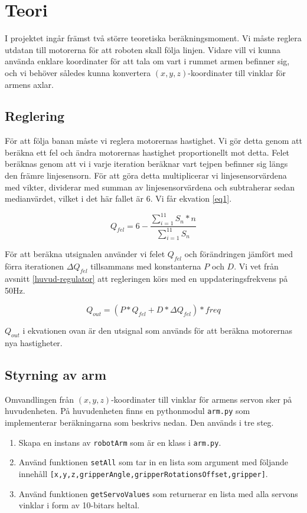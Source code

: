 \section{Teori}
I projektet ingår främst två större teoretiska beräkningsmoment. Vi måste reglera utdatan till motorerna för att roboten skall följa linjen. Vidare vill vi kunna använda enklare koordinater för att tala om vart i rummet armen befinner sig, och vi behöver således kunna konvertera $(x,y,z)$-koordinater till vinklar för armens axlar.

\subsection{Reglering}
För att följa banan måste vi reglera motorernas hastighet. Vi gör detta genom att beräkna ett fel och ändra motorernas hastighet proportionellt mot detta. Felet beräknas genom att vi i varje iteration beräknar vart tejpen befinner sig längs den främre linjesensorn. För att göra detta multiplicerar vi linjesensorvärdena med vikter, dividerar med summan av linjesensorvärdena och subtraherar sedan medianvärdet, vilket i det här fallet är $6$. Vi får ekvation \ref{eq1}.

\begin{equation} \label{eq1}
	Q_{fel}=6-\frac{\sum_{i=1}^{11}S_{n}*n}{\sum_{i=1}^{11}S_n}
\end{equation}

För att beräkna utsignalen använder vi felet $Q_{fel}$ och förändringen jämfört med förra iterationen ${\Delta}Q_{fel}$ tillsammans med konstanterna $P$ och $D$. Vi vet från avsnitt \ref{huvud-regulator} att regleringen körs med en uppdateringsfrekvens på 50Hz.

\begin{equation} \label{eq2}
	Q_{out}=(P*Q_{fel}+D*{\Delta}Q_{fel})*freq
\end{equation}

$Q_{out}$ i ekvationen ovan är den utsignal som används för att beräkna motorernas nya hastigheter.

\subsection{Styrning av arm}
Omvandlingen från $(x,y,z)$-koordinater till vinklar för armens servon sker på huvudenheten. På huvudenheten finns en pythonmodul \texttt{arm.py} som implementerar beräkningarna som beskrivs nedan. Den används i tre steg.
\begin{enumerate}
	\item Skapa en instans av \texttt{robotArm} som är en klass i \texttt{arm.py}.
	\item Använd funktionen \texttt{setAll} som tar in en lista som argument med följande innehåll \newline \texttt{[x,y,z,gripperAngle,gripperRotationsOffset,gripper]}.
	\item Använd funktionen \texttt{getServoValues} som returnerar en lista med alla servons vinklar i form av 10-bitars heltal.
\end{enumerate}

